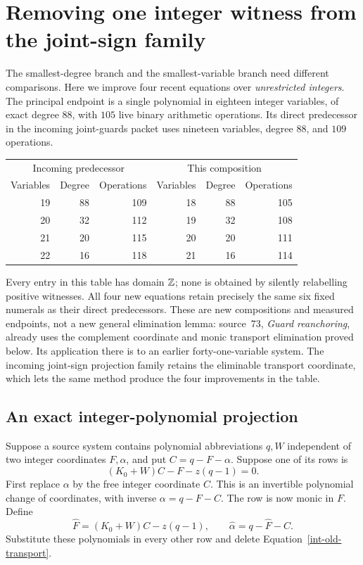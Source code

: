 \section{Removing one integer witness from the joint-sign family}
\label{int-section}

The smallest-degree branch and the smallest-variable branch need different
comparisons.  Here we improve four recent equations over \emph{unrestricted
integers}.  The principal endpoint is a single polynomial in eighteen
integer variables, of exact degree $88$, with $105$ live binary arithmetic
operations.  Its direct predecessor in the incoming joint-guards packet
uses nineteen variables, degree $88$, and $109$ operations.

\begin{center}
\begin{tabular}{rrrrrr}
\toprule
\multicolumn{3}{c}{Incoming predecessor}&\multicolumn{3}{c}{This composition}\\
Variables&Degree&Operations&Variables&Degree&Operations\\
\midrule
19&88&109&18&88&105\\
20&32&112&19&32&108\\
21&20&115&20&20&111\\
22&16&118&21&16&114\\
\bottomrule
\end{tabular}
\end{center}
Every entry in this table has domain $\mathbb Z$; none is obtained by silently
relabelling positive witnesses.  All four new equations retain precisely
the same six fixed numerals as their direct predecessors.  These are new
compositions and measured endpoints, not a new general elimination lemma:
source~73, \emph{Guard reanchoring}, already uses the complement coordinate
and monic transport elimination proved below.  Its application there is to
an earlier forty-one-variable system.  The incoming joint-sign projection
family retains the eliminable transport coordinate, which lets the same
method produce the four improvements in the table.

\subsection{An exact integer-polynomial projection}
\label{int-projection}

Suppose a source system contains polynomial abbreviations $q,W$ independent
of two integer coordinates $F,\alpha$, and put $C=q-F-\alpha$.
Suppose one of its rows is
\begin{equation}
 (K_0+W)C-F-z(q-1)=0.                         \label{int-old-transport}
\end{equation}
First replace $\alpha$ by the free integer coordinate $C$.  This is an
invertible polynomial change of coordinates, with inverse
$\alpha=q-F-C$.  The row is now monic in $F$.  Define
\begin{equation}
 \widehat F=(K_0+W)C-z(q-1),\qquad
 \widehat\alpha=q-\widehat F-C.               \label{int-restore}
\end{equation}
Substitute these polynomials in every other row and delete
Equation~\eqref{int-old-transport}.

